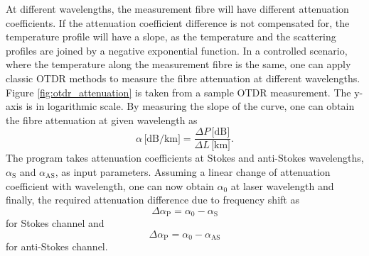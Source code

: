 \documentclass{standalone}
\begin{document}
At different wavelengths, the measurement fibre will have different attenuation coefficients. If the attenuation coefficient difference is not compensated for, the temperature profile will have a slope, as the temperature and the scattering profiles are joined by a negative exponential function. In a controlled scenario, where the temperature along the measurement fibre is the same, one can apply classic OTDR methods to measure the fibre attenuation at different wavelengths. Figure \ref{fig:otdr_attenuation} is taken from a sample OTDR measurement. 
The y-axis is in logarithmic scale. By measuring the slope of the curve, one can obtain the fibre attenuation at given wavelength as \cite{fer:oks}\cite{UnderstandingOTDRs2000}
\begin{equation}
\alpha \, \textrm{[dB/km]} = \dfrac{\varDelta P \, \textrm{[dB]}}{\varDelta L \, \textrm{[km]}} \textrm{.}
\end{equation}
The program takes attenuation coefficients at Stokes and anti-Stokes wavelengths, $\alpha_\textrm{S}$ and $\alpha_\textrm{AS}$, as input parameters. Assuming a linear change of attenuation coefficient with wavelength, one can now obtain $\alpha_0$ at laser wavelength and finally, the required attenuation difference due to frequency shift as
\begin{equation}
\varDelta \alpha_\textrm{P} = \alpha_0 - \alpha_\textrm{S}
\end{equation}
for Stokes channel and
\begin{equation}
\varDelta \alpha_\textrm{P} = \alpha_0 - \alpha_\textrm{AS}
\end{equation}
for anti-Stokes channel. \\
\end{document}
